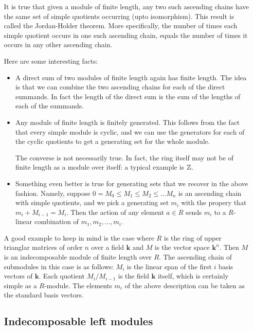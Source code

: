 \documentclass[a4paper]{amsart}
\newcommand{\field}{\mathbf{k}}
\begin{document}
It is true that given a module of finite length, any two such
ascending chains have the same set of simple quotients occurring (upto
isomorphism). This result is called the Jordan-Holder theorem. More
specifically, the number of times each simple quotient occurs in one
such ascending chain, equals the number of times it occurs in any
other ascending chain.

Here are some interesting facts:

\begin{itemize}

\item A direct sum of two modules of finite length again has finite
  length.  The idea is that we can combine the two ascending chains
  for each of the direct summands. In fact the length of the direct
  sum is the sum of the lengths of each of the summands.

\item Any module of finite length is finitely generated. This follows
  from the fact that every simple module is cyclic, and we can use the
  generators for each of the cyclic quotients to get a generating set
  for the whole module.

  The converse is not necessarily true. In fact, the ring itself may
  not be of finite length as a module over itself: a typical example
  is $\mathbb{Z}$.

\item Something even better is true for generating sets that we
  recover in the above fashion. Namely, suppose $0 = M_0 \le M_1 \le
  M_2 \le \ldots M_n$ is an ascending chain with simple quotients, and
  we pick a generating set $m_i$ with the propery that $m_i + M_{i-1}
  = M_i$. Then the action of any element $a \in R$ sends $m_i$ to a
  $R$-linear combination of $m_1, m_2, \ldots, m_i$.

\end{itemize}

A good example to keep in mind is the case where $R$ is the ring of
upper trianglar matrices of order $n$ over a field $\field$ and $M$ is
the vector space $\field^n$. Then $M$ is an indecomposable module of
finite length over $R$. The ascending chain of submodules in this case
is as follows: $M_i$ is the linear span of the first $i$ basis vectors
of $\field$. Each quotient $M_i/M_{i-1}$ is the field $\field$ itself,
which is certainly simple as a $R$-module. The elements $m_i$ of the
above description can be taken as the standard basis vectors.

\subsection{Indecomposable left modules}
\end{document}
